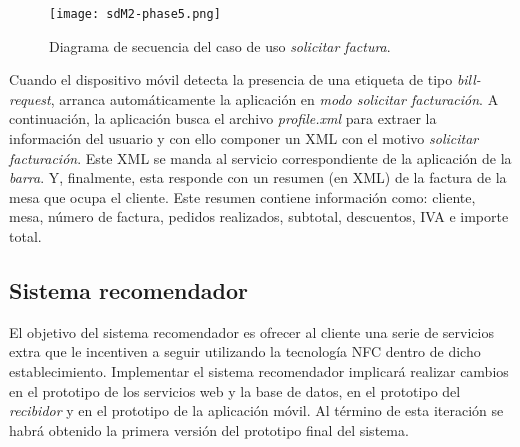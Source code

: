 \begin{itemize}
  \begin{figure}[!h]
    \begin{center}
      \texttt{[image: sdM2-phase5.png]}
      \caption{Diagrama de secuencia del caso de uso \emph{solicitar factura}.}
      \label{fig:sdM2-phase5}
    \end{center}
  \end{figure}

Cuando el dispositivo móvil detecta la presencia de una etiqueta de tipo
\emph{bill-request}, arranca automáticamente la aplicación en \emph{modo
solicitar facturación}. A continuación, la aplicación busca el archivo
\emph{profile.xml} para extraer la información del usuario y con ello componer
un \acs{XML} con el motivo \emph{solicitar facturación}. Este \acs{XML} se
manda al servicio correspondiente de la aplicación de la \emph{barra}. Y,
finalmente, esta responde con un resumen (en \acs{XML}) de la factura de la 
mesa que ocupa el cliente. Este resumen contiene información como: cliente, 
mesa, número de factura, pedidos realizados, subtotal, descuentos, IVA e
importe total.
\end{itemize}


\subsection{Sistema recomendador}
El objetivo del sistema recomendador es ofrecer al cliente una serie de
servicios extra que le incentiven a seguir utilizando la tecnología \acs{NFC}
dentro de dicho establecimiento. Implementar el sistema recomendador implicará
realizar cambios en el prototipo de los servicios web y la base de datos, en
el prototipo del \emph{recibidor} y en el prototipo de la aplicación móvil.
Al término de esta iteración se habrá obtenido la primera versión del prototipo
final del sistema.

